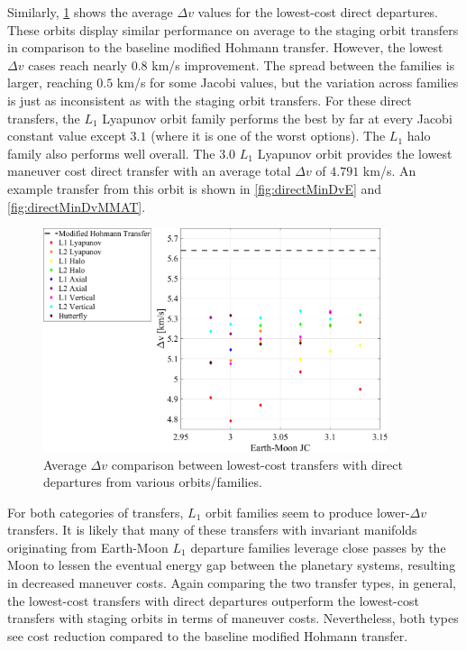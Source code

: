 Similarly, \cref{fig:compareDeltavDirect} shows the average $\Delta v$ values for the lowest-cost
direct departures. These orbits display similar performance on average to the staging orbit
transfers in comparison to the baseline modified Hohmann transfer. However, the lowest $\Delta v$
cases reach nearly $0.8$ km/s improvement. The spread between the families is larger, reaching
$0.5$ km/s for some Jacobi values, but the variation across families is just as inconsistent as
with the staging orbit transfers. For these direct transfers, the $L_{1}$ Lyapunov orbit family
performs the best by far at every Jacobi constant value except $3.1$ (where it is one of the worst
options). The $L_{1}$ halo family also performs well overall. The $3.0$ $L_{1}$ Lyapunov orbit
provides the lowest maneuver cost direct transfer with an average total $\Delta v$ of $4.791$ km/s.
An example transfer from this orbit is shown in \cref{fig:directMinDvE} and
\cref{fig:directMinDvMMAT}.

\begin{figure}[!htb]
    \centering
    \includegraphics[width=0.9\textwidth]{figures/DeltavComparisonDirect.pdf}
    \caption{Average $\Delta v$ comparison between lowest-cost transfers with direct departures from various orbits/families.}
    \label{fig:compareDeltavDirect}
\end{figure}

For both categories of transfers, $L_{1}$ orbit families seem to produce lower-$\Delta v$
transfers. It is likely that many of these transfers with invariant manifolds originating from
Earth-Moon $L_{1}$ departure families leverage close passes by the Moon to lessen the eventual
energy gap between the planetary systems, resulting in decreased maneuver costs. Again comparing
the two transfer types, in general, the lowest-cost transfers with direct departures outperform the
lowest-cost transfers with staging orbits in terms of maneuver costs. Nevertheless, both types see
cost reduction compared to the baseline modified Hohmann transfer.

